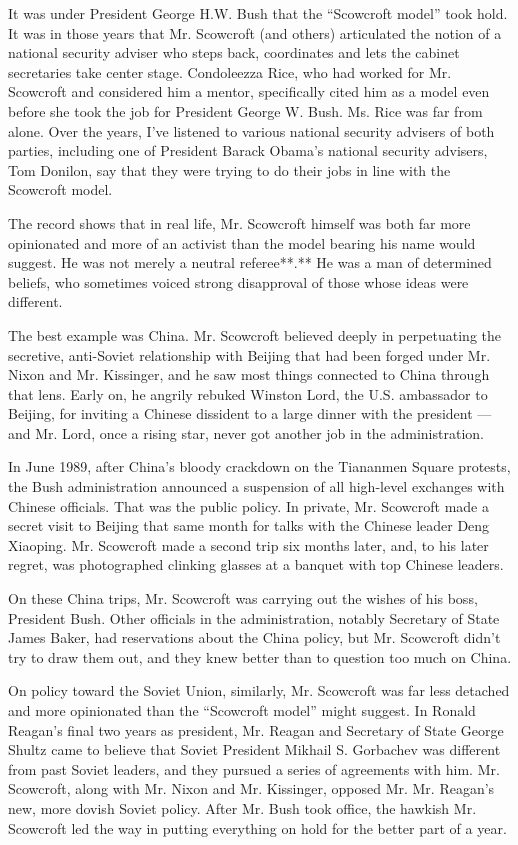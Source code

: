 It was under President George H.W. Bush that the ``Scowcroft model''
took hold. It was in those years that Mr. Scowcroft (and others)
articulated the notion of a national security adviser who steps back,
coordinates and lets the cabinet secretaries take center stage.
Condoleezza Rice, who had worked for Mr. Scowcroft and considered him a
mentor, specifically cited him as a model even before she took the job
for President George W. Bush. Ms. Rice was far from alone. Over the
years, I've listened to various national security advisers of both
parties, including one of President Barack Obama's national security
advisers, Tom Donilon, say that they were trying to do their jobs in
line with the Scowcroft model.

The record shows that in real life, Mr. Scowcroft himself was both far
more opinionated and more of an activist than the model bearing his name
would suggest. He was not merely a neutral referee**.** He was a man of
determined beliefs, who sometimes voiced strong disapproval of those
whose ideas were different.

The best example was China. Mr. Scowcroft believed deeply in
perpetuating the secretive, anti-Soviet relationship with Beijing that
had been forged under Mr. Nixon and Mr. Kissinger, and he saw most
things connected to China through that lens. Early on, he angrily
rebuked Winston Lord, the U.S. ambassador to Beijing, for inviting a
Chinese dissident to a large dinner with the president --- and Mr. Lord,
once a rising star, never got another job in the administration.

In June 1989, after China's bloody crackdown on the Tiananmen Square
protests, the Bush administration announced a suspension of all
high-level exchanges with Chinese officials. That was the public policy.
In private, Mr. Scowcroft made a secret visit to Beijing that same month
for talks with the Chinese leader Deng Xiaoping. Mr. Scowcroft made a
second trip six months later, and, to his later regret, was photographed
clinking glasses at a banquet with top Chinese leaders.

On these China trips, Mr. Scowcroft was carrying out the wishes of his
boss, President Bush. Other officials in the administration, notably
Secretary of State James Baker, had reservations about the China policy,
but Mr. Scowcroft didn't try to draw them out, and they knew better than
to question too much on China.

On policy toward the Soviet Union, similarly, Mr. Scowcroft was far less
detached and more opinionated than the ``Scowcroft model'' might
suggest. In Ronald Reagan's final two years as president, Mr. Reagan and
Secretary of State George Shultz came to believe that Soviet President
Mikhail S. Gorbachev was different from past Soviet leaders, and they
pursued a series of agreements with him. Mr. Scowcroft, along with Mr.
Nixon and Mr. Kissinger, opposed Mr. Mr. Reagan's new, more dovish
Soviet policy. After Mr. Bush took office, the hawkish Mr. Scowcroft led
the way in putting everything on hold for the better part of a year.

